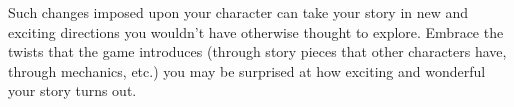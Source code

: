 \documentclass[sheet]{PP}
\begin{document}
Such changes imposed upon your character can take your story in new and exciting directions you wouldn’t have otherwise thought to explore. Embrace the twists that the game introduces (through story pieces that other characters have, through mechanics, etc.) you may be surprised at how exciting and wonderful your story turns out.
\end{document}

